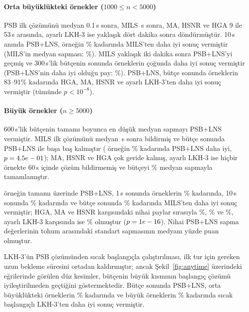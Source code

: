 \paragraph{Orta büyüklükteki örnekler ($1000\le n<5000$)} PSB ilk çözümünü medyan 0.1\,s sonra,
MILS \SotaMilsFirstMid\,s sonra, MA, HSNR ve HGA 9 ile
53\,s arasında, ayarlı LKH-3 ise yaklaşık dört dakika sonra döndürmüştür. 10\,s anında
PSB+LNS, \CountMid{} örneğin \SotaMilsWinTenMid\% kadarında MILS'ten daha iyi sonuç vermiştir (MILS'in medyan sapması:
\SotaMilsTenMid\%). MILS yaklaşık iki dakika sonra PSB+LNS'yi geçmiş ve 300\,s'lik bütçenin
sonunda örneklerin çoğunda daha iyi sonuç vermiştir (PSB+LNS'nin daha iyi olduğu pay:
\SotaMilsWinMid\%). PSB+LNS, bütçe sonunda örneklerin 83--91\% kadarında HGA, MA, HSNR ve
ayarlı LKH-3'ten daha iyi sonuç vermiştir (tümünde $p<10^{-8}$).

\paragraph{Büyük örnekler ($n\ge 5000$)} 600\,s'lik bütçenin tamamı boyunca en düşük
medyan sapmayı PSB+LNS vermiştir. MILS ilk çözümünü medyan
\SotaMilsFirstLarge\,s sonra bildirmiş ve bütçe sonunda PSB+LNS ile başa baş kalmıştır
(\CountLarge{} örneğin \SotaMilsWinLarge\% kadarında PSB+LNS daha iyi, $p=4.5e-01$); MA,
HSNR ve HGA çok geride kalmış, ayarlı LKH-3 ise hiçbir örnekte 60\,s içinde çözüm
bildirmemiş ve bütçeyi \TunedFinalLarge\% medyan sapmayla tamamlamıştır.

\InstAll{} örneğin tamamı üzerinde PSB+LNS, 1\,s sonunda örneklerin \SotaMilsWinOneAll\%
kadarında, 10\,s sonunda \SotaMilsWinTenAll\% kadarında ve bütçe sonunda \SotaMilsWinAll\%
kadarında MILS'ten daha iyi sonuç vermiştir; HGA, MA ve HSNR karşısındaki nihai paylar sırasıyla
\SotaHgaWinAll\%, \SotaMaWinAll\% ve \SotaHsnrWinAll\%, ayarlı LKH-3 karşısında ise
\WinFinalAll\% olmuştur ($p=1e-16$). Nihai PSB+LNS sapma değerlerinin \SeedsMain{} tohum
arasındaki standart sapmasının medyanı \PsbSeedSdAll{} yüzde puan olmuştur.

\begin{table}[t]
\centering
\caption{PSB+LNS ve LKH-3: sabit bütçelerde, bulunan en iyi tamamlanma süresine göre medyan
sapma (\%) ($\infty$: henüz çözüm yok; çözüm bulunamayan koşuların payı
parantez içinde)}\label{tab:budget}
\footnotesize
\setlength{\tabcolsep}{4pt}

\end{table}

LKH-3'ün PSB çözümünden sıcak başlangıçla çalıştırılması, ilk tur için gereken uzun bekleme süresini ortadan
kaldırmıştır; ancak Şekil~\ref{fig:anytime} üzerindeki eğrilerinde görülen düz kesimler, bütçenin
büyük kısmının başlangıç çözümü iyileştirilmeden geçtiğini göstermektedir. Bütçe
sonunda PSB+LNS, orta büyüklükteki örneklerin \WinWarmMid\% kadarında ve büyük örneklerin
\WinWarmLarge\% kadarında sıcak başlangıçlı LKH-3'ten daha iyi sonuç vermiştir.

